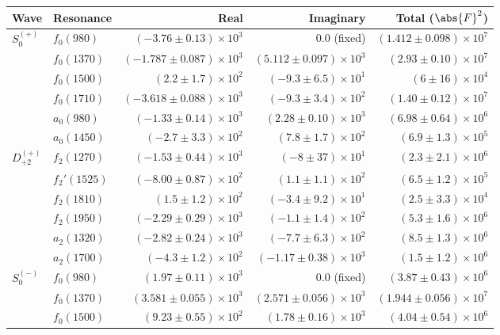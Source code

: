 \begin{table}[ht]
    \begin{center}
        \begin{tabular}{llrrr}\toprule
        Wave & Resonance & Real & Imaginary & Total ($\abs{F}^2$) \\\midrule
$S_{0}^{(+)}$ & $f_{0}(980)$ & $(-3.76 \pm 0.13) \times 10^{3}$ & $0.0$ (fixed) & $(1.412 \pm 0.098) \times 10^{7}$ \\
 & $f_{0}(1370)$ & $(-1.787 \pm 0.087) \times 10^{3}$ & $(5.112 \pm 0.097) \times 10^{3}$ & $(2.93 \pm 0.10) \times 10^{7}$ \\
 & $f_{0}(1500)$ & $(2.2 \pm 1.7) \times 10^{2}$ & $(-9.3 \pm 6.5) \times 10^{1}$ & $(6 \pm 16) \times 10^{4}$ \\
 & $f_{0}(1710)$ & $(-3.618 \pm 0.088) \times 10^{3}$ & $(-9.3 \pm 3.4) \times 10^{2}$ & $(1.40 \pm 0.12) \times 10^{7}$ \\
 & $a_{0}(980)$ & $(-1.33 \pm 0.14) \times 10^{3}$ & $(2.28 \pm 0.10) \times 10^{3}$ & $(6.98 \pm 0.64) \times 10^{6}$ \\
 & $a_{0}(1450)$ & $(-2.7 \pm 3.3) \times 10^{2}$ & $(7.8 \pm 1.7) \times 10^{2}$ & $(6.9 \pm 1.3) \times 10^{5}$ \\
$D_{+2}^{(+)}$ & $f_{2}(1270)$ & $(-1.53 \pm 0.44) \times 10^{3}$ & $(-8 \pm 37) \times 10^{1}$ & $(2.3 \pm 2.1) \times 10^{6}$ \\
 & $f_{2}'(1525)$ & $(-8.00 \pm 0.87) \times 10^{2}$ & $(1.1 \pm 1.1) \times 10^{2}$ & $(6.5 \pm 1.2) \times 10^{5}$ \\
 & $f_{2}(1810)$ & $(1.5 \pm 1.2) \times 10^{2}$ & $(-3.4 \pm 9.2) \times 10^{1}$ & $(2.5 \pm 3.3) \times 10^{4}$ \\
 & $f_{2}(1950)$ & $(-2.29 \pm 0.29) \times 10^{3}$ & $(-1.1 \pm 1.4) \times 10^{2}$ & $(5.3 \pm 1.6) \times 10^{6}$ \\
 & $a_{2}(1320)$ & $(-2.82 \pm 0.24) \times 10^{3}$ & $(-7.7 \pm 6.3) \times 10^{2}$ & $(8.5 \pm 1.3) \times 10^{6}$ \\
 & $a_{2}(1700)$ & $(-4.3 \pm 1.2) \times 10^{2}$ & $(-1.17 \pm 0.38) \times 10^{3}$ & $(1.5 \pm 1.2) \times 10^{6}$ \\
$S_{0}^{(-)}$ & $f_{0}(980)$ & $(1.97 \pm 0.11) \times 10^{3}$ & $0.0$ (fixed) & $(3.87 \pm 0.43) \times 10^{6}$ \\
 & $f_{0}(1370)$ & $(3.581 \pm 0.055) \times 10^{3}$ & $(2.571 \pm 0.056) \times 10^{3}$ & $(1.944 \pm 0.056) \times 10^{7}$ \\
 & $f_{0}(1500)$ & $(9.23 \pm 0.55) \times 10^{2}$ & $(1.78 \pm 0.16) \times 10^{3}$ & $(4.04 \pm 0.54) \times 10^{6}$ \\

\end{tabular}
\end{center}
\end{table}
